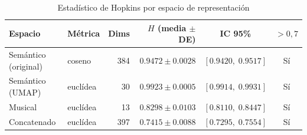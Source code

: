 \begin{table}[htbp]
  \centering
  \caption{Estadístico de Hopkins por espacio de representación}
  \label{tab:hopkins_results}
  \begin{tabular}{llrrcc}
    \toprule
    Espacio & Métrica & Dims & $H$ (media $\pm$ DE) & IC 95\% & $> 0{,}7$ \\
    \midrule
    Semántico (original) & coseno & 384 & $0.9472 \pm 0.0028$ & $[0.9420,\; 0.9517]$ & Sí \\
    Semántico (UMAP) & euclídea & 30 & $0.9923 \pm 0.0005$ & $[0.9914,\; 0.9931]$ & Sí \\
    Musical & euclídea & 13 & $0.8298 \pm 0.0103$ & $[0.8110,\; 0.8447]$ & Sí \\
    Concatenado & euclídea & 397 & $0.7415 \pm 0.0088$ & $[0.7295,\; 0.7554]$ & Sí \\
    \bottomrule
  \end{tabular}
\end{table}